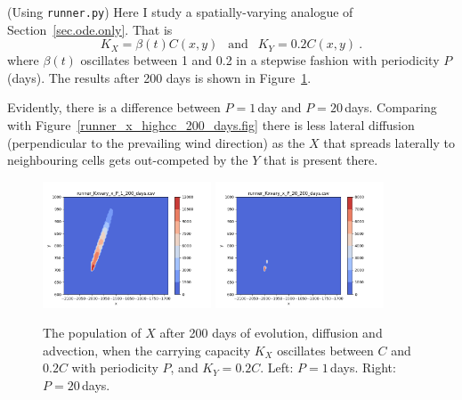 \documentclass{article}
\begin{document}
(Using {\tt runner.py})  Here I study a spatially-varying analogue of Section~\ref{sec.ode.only}.  That is
\begin{equation}
  K_{X} = \beta(t) C(x, y) \ \ \mbox{ and }\ \  K_{Y} = 0.2 C(x, y) \ .
\end{equation}
where $\beta(t)$ oscillates between 1 and 0.2 in a stepwise fashion with periodicity $P$ (days).  The results after 200 days is shown in Figure~\ref{runner_Kxvary_x_P_1_200_days.fig}.

Evidently, there is a difference between $P=1$\,day and $P=20$\,days.  Comparing with Figure~\ref{runner_x_highcc_200_days.fig} there is less lateral diffusion (perpendicular to the prevailing wind direction) as the $X$ that spreads laterally to neighbouring cells gets out-competed by the $Y$ that is present there.

\begin{figure}[htb]
  \centering
  \includegraphics[width=5cm]{runner_Kxvary_x_P_1_200_days.png} \quad
  \includegraphics[width=5cm]{runner_Kxvary_x_P_20_200_days.png}
  \caption{\label{runner_Kxvary_x_P_1_200_days.fig}The population of $X$ after 200 days of evolution, diffusion and advection, when the carrying capacity $K_{X}$ oscillates between $C$ and $0.2C$ with periodicity $P$, and $K_{Y}=0.2C$.  Left: $P=1$\,days.  Right: $P=20$\,days.}
\end{figure}
\end{document}

